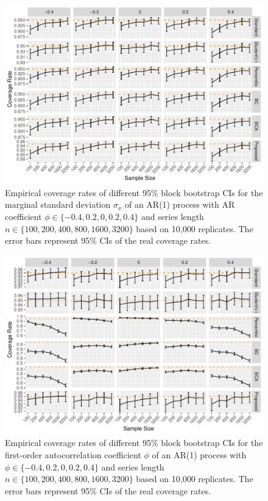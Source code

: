 \documentclass[12pt, letterpaper, titlepage]{article}
\begin{document}
\begin{figure}[tbp]
  \centering
  \includegraphics[width=\textwidth]{figures/plot_norm_sigma}
  \caption{Empirical coverage rates of different 95\% block bootstrap CIs for
    the marginal standard deviation $\sigma_x$ of an AR(1) 
		process with AR
    coefficient $\phi \in \{-0.4, 0.2, 0, 0.2, 0.4\}$ and series length
    $n \in \{100, 200, 400, 800, 1600, 3200\}$ based on 10,000 replicates.
    The error bars represent 95\% CIs of the real coverage rates.}
  \label{fig:sigma}
\end{figure}

\begin{figure}[tbp]
  \centering
  \includegraphics[width=\textwidth]{figures/plot_norm_phi}
  \caption{Empirical coverage rates of different 95\% block bootstrap CIs for
    the first-order autocorrelation coefficient $\phi$ of an AR(1) process with
    $\phi \in \{-0.4, 0.2, 0, 0.2, 0.4\}$ and series length
    $n \in \{100, 200, 400, 800, 1600, 3200\}$ based on 10,000 replicates.
    The error bars represent 95\% CIs of the real coverage rates.}
  \label{fig:phi}
\end{figure}
\end{document}
